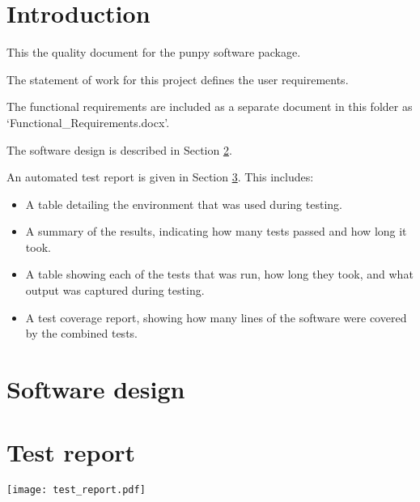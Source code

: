 \documentclass{article}
\begin{document}

\tableofcontents



\clearpage
\pagestyle{long}


\graphicspath{{images/}}
\graphicspath{{./}}

\section{Introduction}\label{introduction}

This the quality document for the punpy software package.


The statement of work for this project defines the user requirements.

The functional requirements are included as a separate document in this folder as `Functional\_Requirements.docx'.

The software design is described in Section \ref{design}.

An automated test report is given in Section \ref{testreport}. This includes:
\begin{itemize}
\item A table detailing the environment that was used during testing.
\item A summary of the results, indicating how many tests passed and how long it took.
\item A table showing each of the tests that was run, how long they took, and what output was captured during testing.
\item A test coverage report, showing how many lines of the software were covered by the combined tests.
\end{itemize}

\clearpage
\section{Software design}\label{design}



\clearpage
\section{Test report}\label{testreport}

\texttt{[image: test\_report.pdf]}
\end{document}
